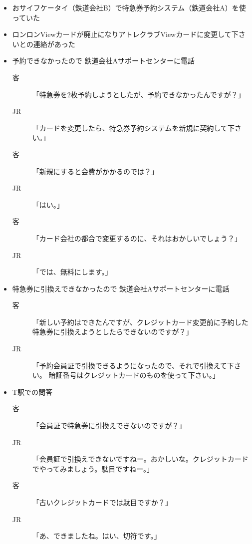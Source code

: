 \begin{itemize}
\item おサイフケータイ（鉄道会社B）で特急券予約システム（鉄道会社A）を使っていた
\item ロンロンViewカードが廃止になりアトレクラブViewカードに変更して下さいとの連絡があった
\item 予約できなかったので 鉄道会社Aサポートセンターに電話

	\begin{description}
	\item [客]「特急券を2枚予約しようとしたが、予約できなかったんですが？」
	\item [JR]「カードを変更したら、特急券予約システムを新規に契約して下さい。」
	\item [客]「新規にすると会費がかかるのでは？」
	\item [JR]「はい。」
	\item [客]「カード会社の都合で変更するのに、それはおかしいでしょう？」
	\item [JR]「では、無料にします。」
	\end{description}

\item 特急券に引換えできなかったので 鉄道会社Aサポートセンターに電話

	\begin{description}
	\item [客]「新しい予約はできたんですが、クレジットカード変更前に予約した特急券に引換えようとしたらできないのですが？」
	\item [JR]「予約会員証で引換できるようになったので、それで引換えて下さい。
			暗証番号はクレジットカードのものを使って下さい。」
	\end{description}

\item T駅での問答

	\begin{description}
	\item [客]「会員証で特急券に引換えできないのですが？」
	\item [JR]「会員証で引換えできないですねー。おかしいな。クレジットカードでやってみましょう。駄目ですねー。」
	\item [客]「古いクレジットカードでは駄目ですか？」
	\item [JR]「あ、できましたね。はい、切符です。」
	\end{description}

\end{itemize} 



